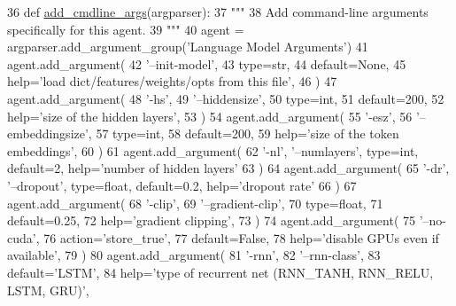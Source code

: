 \begin{DoxyCode}
36     \textcolor{keyword}{def }\hyperlink{namespaceparlai_1_1agents_1_1drqa_1_1config_a62fdd5554f1da6be0cba185271058320}{add\_cmdline\_args}(argparser):
37         \textcolor{stringliteral}{"""}
38 \textcolor{stringliteral}{        Add command-line arguments specifically for this agent.}
39 \textcolor{stringliteral}{        """}
40         agent = argparser.add\_argument\_group(\textcolor{stringliteral}{'Language Model Arguments'})
41         agent.add\_argument(
42             \textcolor{stringliteral}{'--init-model'},
43             type=str,
44             default=\textcolor{keywordtype}{None},
45             help=\textcolor{stringliteral}{'load dict/features/weights/opts from this file'},
46         )
47         agent.add\_argument(
48             \textcolor{stringliteral}{'-hs'},
49             \textcolor{stringliteral}{'--hiddensize'},
50             type=int,
51             default=200,
52             help=\textcolor{stringliteral}{'size of the hidden layers'},
53         )
54         agent.add\_argument(
55             \textcolor{stringliteral}{'-esz'},
56             \textcolor{stringliteral}{'--embeddingsize'},
57             type=int,
58             default=200,
59             help=\textcolor{stringliteral}{'size of the token embeddings'},
60         )
61         agent.add\_argument(
62             \textcolor{stringliteral}{'-nl'}, \textcolor{stringliteral}{'--numlayers'}, type=int, default=2, help=\textcolor{stringliteral}{'number of hidden layers'}
63         )
64         agent.add\_argument(
65             \textcolor{stringliteral}{'-dr'}, \textcolor{stringliteral}{'--dropout'}, type=float, default=0.2, help=\textcolor{stringliteral}{'dropout rate'}
66         )
67         agent.add\_argument(
68             \textcolor{stringliteral}{'-clip'},
69             \textcolor{stringliteral}{'--gradient-clip'},
70             type=float,
71             default=0.25,
72             help=\textcolor{stringliteral}{'gradient clipping'},
73         )
74         agent.add\_argument(
75             \textcolor{stringliteral}{'--no-cuda'},
76             action=\textcolor{stringliteral}{'store\_true'},
77             default=\textcolor{keyword}{False},
78             help=\textcolor{stringliteral}{'disable GPUs even if available'},
79         )
80         agent.add\_argument(
81             \textcolor{stringliteral}{'-rnn'},
82             \textcolor{stringliteral}{'--rnn-class'},
83             default=\textcolor{stringliteral}{'LSTM'},
84             help=\textcolor{stringliteral}{'type of recurrent net (RNN\_TANH, RNN\_RELU, LSTM, GRU)'},

\end{DoxyCode}
